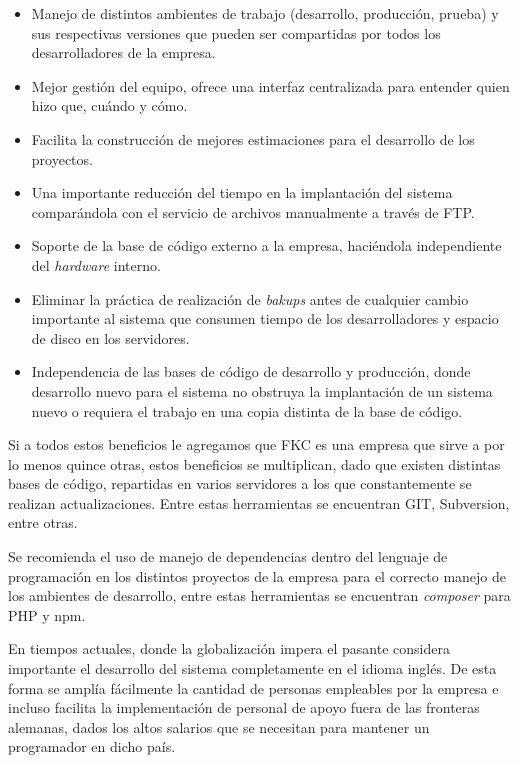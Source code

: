 \begin{itemize}
	\item Manejo de distintos ambientes de trabajo (desarrollo, producción, prueba) y sus respectivas versiones que pueden ser compartidas por todos los desarrolladores de la empresa.
	
	\item Mejor gestión del equipo, ofrece una interfaz centralizada para entender quien hizo que, cuándo y cómo.

	\item Facilita la construcción de mejores estimaciones para el desarrollo de los proyectos.

	\item Una importante reducción del tiempo en la implantación del sistema comparándola con el servicio de archivos manualmente a través de FTP.

	\item Soporte de la base de código externo a la empresa, haciéndola independiente del \emph{hardware} interno.

	\item Eliminar la práctica de realización de \emph{bakups} antes de cualquier cambio importante al sistema que consumen tiempo de los desarrolladores y espacio de disco en los servidores.

	\item Independencia de las bases de código de desarrollo y producción, donde desarrollo nuevo para el sistema no obstruya la implantación de un sistema nuevo o requiera el trabajo en una copia distinta de la base de código.
\end{itemize}

Si a todos estos beneficios le agregamos que FKC es una empresa que sirve a por lo menos quince otras, estos beneficios se multiplican, dado que existen distintas bases de código, repartidas en varios servidores a los que constantemente se realizan actualizaciones. Entre estas herramientas se encuentran GIT, Subversion, entre otras.

Se recomienda el uso de manejo de dependencias dentro del lenguaje de programación en los distintos proyectos de la empresa para el correcto manejo de los ambientes de desarrollo, entre estas herramientas se encuentran \emph{composer} para PHP y npm. 

En tiempos actuales, donde la globalización impera el pasante considera importante el desarrollo del sistema completamente en el idioma inglés. De esta forma se amplía fácilmente la cantidad de personas empleables por la empresa e incluso facilita la implementación de personal de apoyo fuera de las fronteras alemanas, dados los altos salarios que se necesitan para mantener un programador en dicho país.

